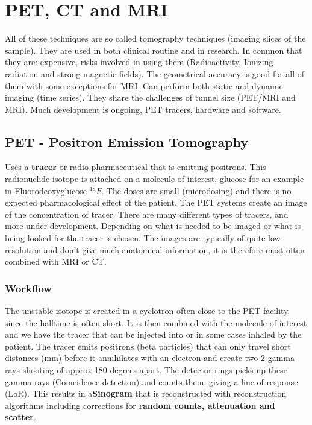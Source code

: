 \section{PET, CT and MRI}
All of these techniques are so called tomography techniques (imaging slices of the sample). They are used in both clinical routine and in research. In common that they are: expensive, risks involved in using them (Radioactivity, Ionizing radiation and strong magnetic fields). The geometrical accuracy is good for all of them with some exceptions for MRI. Can perform both static and dynamic imaging (time series). They share the challenges of tunnel size (PET/MRI and MRI). Much development is ongoing, PET tracers, hardware and software. 

	\subsection{PET - Positron Emission Tomography}
	Uses a \textbf{tracer} or radio pharmaceutical that is emitting positrons. This radionuclide isotope is attached on a molecule of interest, glucose for an example in Fluorodeoxyglucose $^{18}F$. The doses are small (microdosing) and there is no expected pharmacological effect of the patient. The PET systems create an image of the concentration of tracer. There are many different types of tracers, and more under development. Depending on what is needed to be imaged or what is being looked for the tracer is chosen. The images are typically of quite low resolution and don't give much anatomical information, it is therefore most often combined with MRI or CT. 

		\subsubsection{Workflow}
		The unstable isotope is created in a cyclotron often close to the PET facility, since the halftime is often short. It is then combined with the molecule of interest and we have the tracer that can be injected into or in some cases inhaled by the patient. The tracer emits positrons (beta particles) that can only travel short distances (mm) before it annihilates with an electron and create two 2 gamma rays shooting of approx 180 degrees apart. The detector rings picks up these gamma rays (Coincidence detection) and counts them, giving a line of response (LoR). This results in a\textbf{Sinogram} that is reconstructed with reconstruction algorithms including corrections for \textbf{random counts, attenuation and scatter}. 

